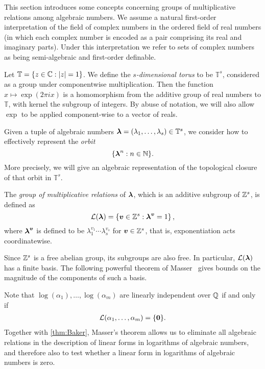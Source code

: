 \label{sec:mult}

This section introduces some concepts concerning groups of multiplicative relations among algebraic numbers. We assume a natural first-order interpretation of the field of complex numbers in the ordered field of real numbers (in which each complex number is encoded as a pair comprising its real and imaginary parts). Under this interpretation we refer to sets of complex numbers as being semi-algebraic and first-order definable.

Let $\mathbb{T}=\lbrace z \in \mathbb{C}: \lvert z \rvert = 1 \rbrace$. We define the \emph{$s$-dimensional torus} to be $\mathbb{T}^s$, considered as a group under componentwise multiplication. Then the function $x \mapsto \exp(2 \pi i x)$ is a homomorphism from the additive group of real numbers to $\mathbb{T}$, with kernel the subgroup of integers. By abuse of notation, we will also allow $\exp$ to be applied component-wise to a vector of reals.

Given a tuple of algebraic numbers $\boldsymbol{\lambda} = (\lambda_{1}, \ldots, \lambda_{s}) \in \mathbb{T}^{s}$, we consider how to effectively represent the \emph{orbit}
\begin{equation*}
\lbrace \boldsymbol{\lambda}^{n} : n \in \mathbb{N} \rbrace.
\end{equation*}
More precisely, we will give an algebraic representation of the topological closure of that orbit in $\mathbb{T}^s$.

The \emph{group of multiplicative relations} of $\boldsymbol{\lambda}$, which is an additive subgroup of $\mathbb{Z}^s$, is defined as
\begin{equation*}
{\mathcal{L}}(\boldsymbol{\lambda})=\lbrace \boldsymbol{v}\in \mathbb{Z}^s : \boldsymbol\lambda^{\boldsymbol v}=1 \rbrace \, ,
\end{equation*}
where $\boldsymbol\lambda^{\boldsymbol v}$ is defined to be $\lambda_1^{v_1}\cdots\lambda_s^{v_s}$ for $\boldsymbol{v}\in \mathbb{Z}^s$, that is, exponentiation acts coordinatewise.

Since $\mathbb{Z}^s$ is a free abelian group, its subgroups are also
free.  In particular, ${\mathcal{L}}(\boldsymbol\lambda)$ has a finite basis. The
following powerful theorem of Masser~\cite{Mas88} gives bounds on the
magnitude of the components of such a basis.

Note that $\log(\alpha_{1}), \ldots, \log(\alpha_{m})$ are linearly independent over $\mathbb{Q}$ if and only if
\begin{align*}
{\mathcal{L}}(\alpha_{1}, \ldots, \alpha_{m}) = \lbrace \boldsymbol{0} \rbrace .
\end{align*}
Together with \cref{thm:Baker}, Masser's theorem allows us to eliminate all algebraic relations in the description of linear forms in logarithms of algebraic numbers, and therefore also to test whether a linear form in logarithms of algebraic numbers is zero.

